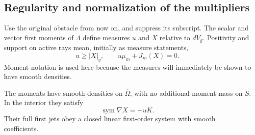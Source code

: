 \subsection{Regularity and normalization of the multipliers}

Use the original obstacle from now on, and suppress its subscript.  The
scalar and vector first moments of \(\Lambda\) define measures \(u\)
and \(X\) relative to \(dV_g\).  Positivity and support on active rays
mean, initially as measure statements,
\begin{equation}\label{va:complementarity}
 u\ge |X|_g,\qquad u\mu_m+J_m(X)=0.
\end{equation}
Moment notation is used here because the measures will immediately be
shown to have smooth densities.

\begin{lemma}\label{va:smooth-moments}
The moments have smooth densities on \(\overline\Omega\), with no
additional moment mass on \(S\).  In the interior they satisfy
\begin{equation}\label{va:shift-equation}
 \operatorname{sym}\nabla X=-uK.
\end{equation}
Their full first jets obey a closed linear first-order system with
smooth coefficients.
\end{lemma}
